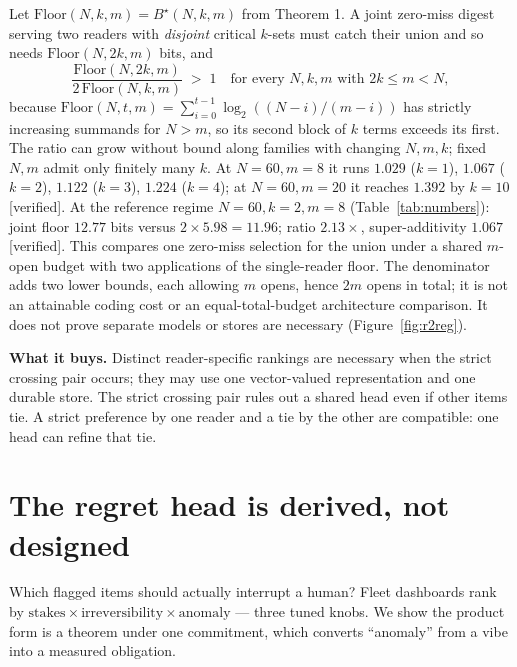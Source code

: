 \documentclass[11pt,a4paper]{article}
\begin{document}
\begin{claim}
Let $\mathrm{Floor}(N,k,m)=B^\star(N,k,m)$ from Theorem 1. A joint zero-miss digest serving two readers with \emph{disjoint} critical $k$-sets must catch their union and so needs $\mathrm{Floor}(N,2k,m)$ bits, and
\[
\frac{\mathrm{Floor}(N,2k,m)}{2\,\mathrm{Floor}(N,k,m)}\;>\;1
\quad\text{for every } N,k,m \text{ with } 2k\le m<N,
\]
because $\mathrm{Floor}(N,t,m)=\allowbreak\sum_{i=0}^{t-1}\log_2((N-i)/(m-i))$ has strictly increasing summands for $N>m$, so its second block of $k$ terms exceeds its first. The ratio can grow without bound along families with changing $N,m,k$; fixed $N,m$ admit only finitely many $k$. At $N{=}60,m{=}8$ it runs $1.029$ ($k{=}1$), $1.067$ ($k{=}2$), $1.122$ ($k{=}3$), $1.224$ ($k{=}4$); at $N{=}60,m{=}20$ it reaches $1.392$ by $k{=}10$ [verified]. At the reference regime $N{=}60,k{=}2,m{=}8$ (Table~\ref{tab:numbers}): joint floor $12.77$ bits versus $2\times 5.98=11.96$; ratio $2.13\times$, super-additivity $1.067$ [verified]. This compares one zero-miss selection for the union under a shared $m$-open budget with two applications of the single-reader floor. The denominator adds two lower bounds, each allowing $m$ opens, hence $2m$ opens in total; it is not an attainable coding cost or an equal-total-budget architecture comparison. It does not prove separate models or stores are necessary (Figure~\ref{fig:r2reg}).
\end{claim}

\textbf{What it buys.} Distinct reader-specific rankings are necessary when the strict crossing pair occurs; they may use one vector-valued representation and one durable store. The strict crossing pair rules out a shared head even if other items tie. A strict preference by one reader and a tie by the other are compatible: one head can refine that tie.



\section{The regret head is derived, not designed}\label{sec:regret}
Which flagged items should actually interrupt a human? Fleet dashboards rank by $\mathrm{stakes}\times\mathrm{irreversibility}\times\mathrm{anomaly}$ --- three tuned knobs. We show the product form is a theorem under one commitment, which converts ``anomaly'' from a vibe into a measured obligation.
\end{document}
